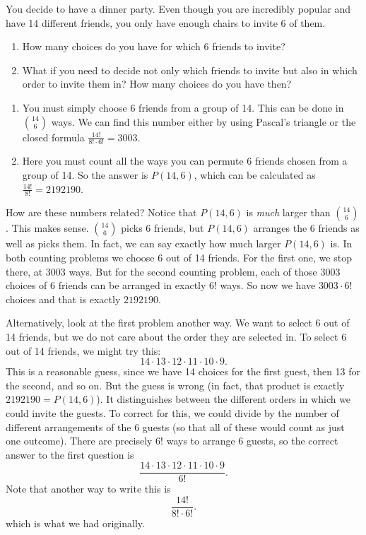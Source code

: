 \documentclass[12pt]{article}
\begin{document}
\begin{example}
  You decide to have a dinner party.  Even though you are incredibly popular and have 14 different friends, you only have enough chairs to invite 6 of them.
  \begin{enumerate}
    \item How many choices do you have for which 6 friends to invite?
    \item What if you need to decide not only which friends to invite but also in which order to invite them in?  How many choices do you have then?
  \end{enumerate}
  \begin{solution}
    \begin{enumerate}

      \item You must simply choose 6 friends from a group of 14.  This can be done in ${14 \choose 6}$ ways.  We can find this number either by using Pascal's triangle or the closed formula $\frac{14!}{8!\cdot 6!} = 3003$.

      \item Here you must count all the ways you can permute 6 friends chosen from a group of 14.  So the answer is $P(14, 6)$, which can be calculated as $\frac{14!}{8!} = 2192190$.
   \end{enumerate}
    How are these numbers related?  Notice that $P(14,6)$ is {\em much} larger than ${14 \choose 6}$.  This makes sense. ${14 \choose 6}$ picks 6 friends, but $P(14,6)$  arranges the 6 friends as well as picks them.  In fact, we can say exactly how much larger $P(14,6)$ is.  In both counting problems we choose 6 out of 14 friends.  For the first one, we stop there, at 3003 ways.  But for the second counting problem, each of those 3003 choices of 6 friends can be arranged in exactly $6!$ ways.  So now we have $3003\cdot 6!$ choices and that is exactly $2192190$.

    Alternatively, look at the first problem another way.  We want to select 6 out of 14 friends, but we do not care about the order they are selected in.  To select 6 out of 14 friends, we might try this:
    \[14 \cdot 13 \cdot 12 \cdot 11 \cdot 10 \cdot 9.\]
    This is a reasonable guess, since we have 14 choices for the first guest, then 13 for the second, and so on.  But the guess is wrong (in fact, that product is exactly $2192190 = P(14,6)$).  It distinguishes between the different orders in which we could invite the guests.  To correct for this, we could divide by the number of different arrangements of the 6 guests (so that all of these would count as just one outcome).  There are precisely $6!$ ways to arrange 6 guests, so the correct answer to the first question is
    \[\frac{14 \cdot 13 \cdot 12 \cdot 11\cdot 10 \cdot 9}{6!}.\]
    Note that another way to write this is
    \[\frac{14!}{8!\cdot 6!}.\]
    which is what we had originally.
  \end{solution}

\end{example}
\end{document}
